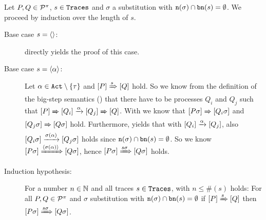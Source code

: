 \begin{prf}
Let $P,Q\in\mathcal P^{\pi}$, $s\in\mathtt{Traces}$ and $\sigma$ a substitution with $\mathtt{n}(\sigma)\cap\mathtt{bn}(s)=\emptyset$. We proceed by induction over the length of $s$.
\begin{description}
\item[Base case $s=\langle\rangle$:]  directly yields the proof of this case.

\item[Base case $s=\langle\alpha\rangle$:] Let $\alpha\in\actions\setminus\set{\tau}$ and $\left[P\right]\xRightarrow{s}\left[Q\right]$ hold. So we know from the definition of the big-step semantics () that there have to be processes $Q_i$ and $Q_j$ such that $\left[P\right]\xRightarrow{}\left[Q_i\right]\xrightarrow{\alpha}\left[Q_j\right]\xRightarrow{}\left[Q\right]$. With  we know that $\left[P\sigma\right]\xRightarrow{}\left[Q_i\sigma\right]$ and $\left[Q_j\sigma\right]\xRightarrow{}\left[Q\sigma\right]$ hold. Furthermore,  yields that with $\left[Q_i\right]\xrightarrow{\alpha}\left[Q_j\right]$, also $\left[Q_i\sigma\right]\xrightarrow{\sigma(\alpha)}\left[Q_j\sigma\right]$ holds since $\mathtt{n}(\sigma)\cap\mathtt{bn}(s)=\emptyset$. So we know $\left[P\sigma\right]\xRightarrow{\langle\sigma(\alpha)\rangle}\left[Q\sigma\right]$, hence $\left[P\sigma\right]\xRightarrow{s\sigma}\left[Q\sigma\right]$ holds.

\item[Induction hypothesis:] For a number $n\in\mathbb N$ and all traces $s\in\mathtt{Traces}$, with $n\leq\#(s)$ holds: For all $P,Q\in\mathcal P^{\pi}$ and $\sigma$ substitution with $\mathtt{n}(\sigma)\cap\mathtt{bn}(s)=\emptyset$ if $\left[P\right]\xRightarrow{s}\left[Q\right]$ then $\left[P\sigma\right]\xRightarrow{s\sigma}\left[Q\sigma\right]$. 


\end{description}
\end{prf}

